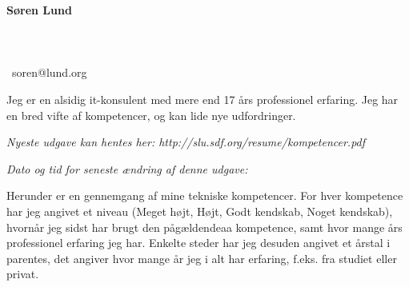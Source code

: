 \documentclass[a4paper,11pt]{article}
\newcommand\redacted{[skjult i online version]}
\newcommand\myaddressone{\redacted}
\newcommand\myaddresstwo{\redacted}
\newcommand\myphone{\redacted}
\begin{document}
\centerline{}
\centerline{}

\begin{minipage}[b]{0.30\textwidth}
  \selectfont%
  \textbf{Søren Lund} \\
  \myaddressone \\
  \myaddresstwo \\
  \myphone \\
  \Email\ soren@lund.org
\end{minipage}%
\hfill
\begin{minipage}[b]{0.30\textwidth}
  \selectfont%
  Jeg er en alsidig it-konsulent med
  mere end 17 års professionel
  erfaring. Jeg har en bred vifte af
  kompetencer, og
  kan lide nye udfordringer.
\end{minipage}

\bigskip
\centerline{\small\textit{Nyeste udgave kan hentes her: http://slu.sdf.org/resume/kompetencer.pdf}}
\centerline{\small\textit{Dato og tid for seneste ændring af denne udgave: }}

\bigskip
\bigskip

\newcommand\High{Meget højt}
\newcommand\high{Højt}
\newcommand\know{Godt kendskab}
\newcommand\some{Noget kendskab}

Herunder er en gennemgang af mine tekniske kompetencer. For hver
kompetence har jeg angivet et niveau (\High, \high, \know, \some),
hvornår jeg sidst har brugt den pågældendeaa kompetence, samt hvor
mange års professionel erfaring jeg har. Enkelte steder har jeg
desuden angivet et årstal i parentes, det angiver hvor mange år jeg i
alt har erfaring, f.eks. fra studiet eller privat.
\end{document}
